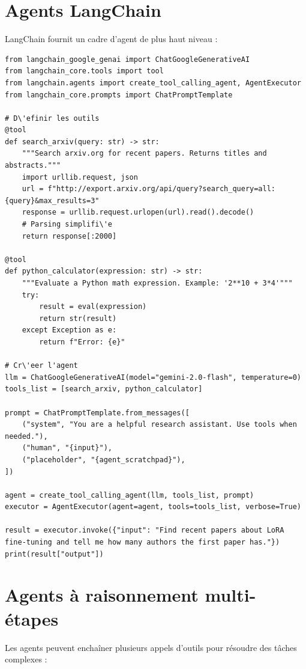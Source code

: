 \section{Agents LangChain}

LangChain fournit un cadre d'agent de plus haut niveau :

\begin{verbatim}
from langchain_google_genai import ChatGoogleGenerativeAI
from langchain_core.tools import tool
from langchain.agents import create_tool_calling_agent, AgentExecutor
from langchain_core.prompts import ChatPromptTemplate

# D\'efinir les outils
@tool
def search_arxiv(query: str) -> str:
    """Search arxiv.org for recent papers. Returns titles and abstracts."""
    import urllib.request, json
    url = f"http://export.arxiv.org/api/query?search_query=all:{query}&max_results=3"
    response = urllib.request.urlopen(url).read().decode()
    # Parsing simplifi\'e
    return response[:2000]

@tool
def python_calculator(expression: str) -> str:
    """Evaluate a Python math expression. Example: '2**10 + 3*4'"""
    try:
        result = eval(expression)
        return str(result)
    except Exception as e:
        return f"Error: {e}"

# Cr\'eer l'agent
llm = ChatGoogleGenerativeAI(model="gemini-2.0-flash", temperature=0)
tools_list = [search_arxiv, python_calculator]

prompt = ChatPromptTemplate.from_messages([
    ("system", "You are a helpful research assistant. Use tools when needed."),
    ("human", "{input}"),
    ("placeholder", "{agent_scratchpad}"),
])

agent = create_tool_calling_agent(llm, tools_list, prompt)
executor = AgentExecutor(agent=agent, tools=tools_list, verbose=True)

result = executor.invoke({"input": "Find recent papers about LoRA fine-tuning and tell me how many authors the first paper has."})
print(result["output"])
\end{verbatim}

\section{Agents \`a raisonnement multi-\'etapes}

Les agents peuvent encha\^iner plusieurs appels d'outils pour r\'esoudre des t\^aches complexes :

